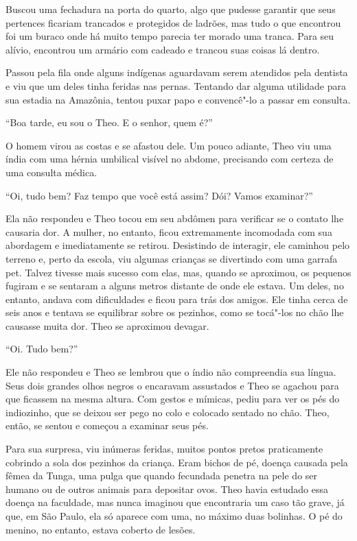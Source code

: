Buscou uma fechadura na porta do quarto, algo que pudesse garantir que
seus pertences ficariam trancados e protegidos de ladrões, mas tudo o
que encontrou foi um buraco onde há muito tempo parecia ter morado uma
tranca. Para seu alívio, encontrou um armário com cadeado e trancou suas
coisas lá dentro.

Passou pela fila onde alguns indígenas aguardavam serem atendidos pela
dentista e viu que um deles tinha feridas nas pernas. Tentando dar
alguma utilidade para sua estadia na Amazônia, tentou puxar papo e
convencê"-lo a passar em consulta.

``Boa tarde, eu sou o Theo. E o senhor, quem é?''

O homem virou as costas e se afastou dele. Um pouco adiante, Theo viu
uma índia com uma hérnia umbilical visível no abdome, precisando com
certeza de uma consulta médica.

``Oi, tudo bem? Faz tempo que você está assim? Dói? Vamos examinar?''

Ela não respondeu e Theo tocou em seu abdômen para verificar se o
contato lhe causaria dor. A mulher, no entanto, ficou extremamente
incomodada com sua abordagem e imediatamente se retirou. Desistindo de
interagir, ele caminhou pelo terreno e, perto da escola, viu algumas
crianças se divertindo com uma garrafa pet. Talvez tivesse mais sucesso
com elas, mas, quando se aproximou, os pequenos fugiram e se sentaram a
alguns metros distante de onde ele estava. Um deles, no entanto, andava
com dificuldades e ficou para trás dos amigos. Ele tinha cerca de seis
anos e tentava se equilibrar sobre os pezinhos, como se tocá"-los no chão
lhe causasse muita dor. Theo se aproximou devagar.

``Oi. Tudo bem?''

Ele não respondeu e Theo se lembrou que o índio não compreendia sua
língua. Seus dois grandes olhos negros o encaravam assustados e Theo se
agachou para que ficassem na mesma altura. Com gestos e mímicas, pediu
para ver os pés do indiozinho, que se deixou ser pego no colo e colocado
sentado no chão. Theo, então, se sentou e começou a examinar seus pés.

Para sua surpresa, viu inúmeras feridas, muitos pontos pretos
praticamente cobrindo a sola dos pezinhos da criança. Eram bichos de pé,
doença causada pela fêmea da Tunga, uma pulga que quando fecundada
penetra na pele do ser humano ou de outros animais para depositar ovos.
Theo havia estudado essa doença na faculdade, mas nunca imaginou que
encontraria um caso tão grave, já que, em São Paulo, ela só aparece com
uma, no máximo duas bolinhas. O pé do menino, no entanto, estava coberto
de lesões.


